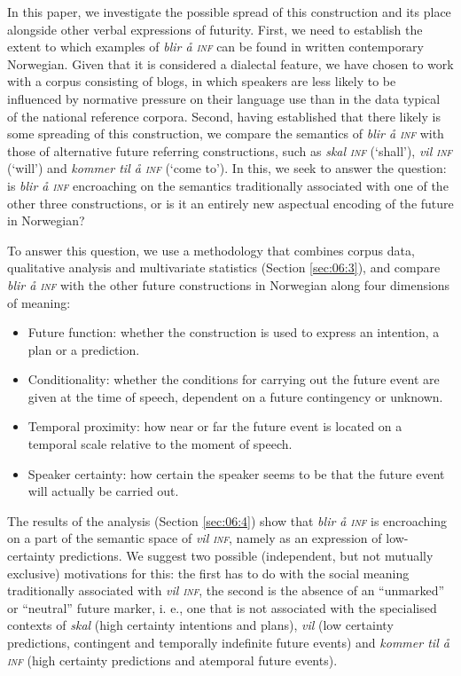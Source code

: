 \documentclass[output=paper,colorlinks,citecolor=brown]{langscibook}
\begin{document}
In this paper, we investigate the possible spread of this construction and its place alongside other verbal expressions of futurity. First, we need to establish the extent to which examples of \textit{blir å \textsc{inf}} can be found in written contemporary Norwegian. Given that it is considered a dialectal feature, we have chosen to work with a corpus consisting of blogs, in which speakers are less likely to be influenced by normative pressure on their language use than in the data typical of the national reference corpora. Second, having established that there likely is some spreading of this construction, we compare the semantics of \textit{blir å \textsc{inf}} with those of alternative future referring constructions, such as \textit{skal \textsc{inf}} (‘shall’), \textit{vil \textsc{inf}} (‘will’) and \textit{kommer til å \textsc{inf}} (‘come to’). In this, we seek to answer the question: is \textit{blir å \textsc{inf}} encroaching on the semantics traditionally associated with one of the other three constructions, or is it an entirely new aspectual encoding of the future in Norwegian? 

To answer this question, we use a methodology that combines corpus data, qualitative analysis and multivariate statistics (Section \ref{sec:06:3}), and compare \textit{blir å \textsc{inf}} with the other future constructions in Norwegian along four dimensions of meaning:
\begin{itemize}
    \item Future function: whether the construction is used to express an intention, a plan or a prediction.
    \item Conditionality: whether the conditions for carrying out the future event are given at the time of speech, dependent on a future contingency or unknown.
    \item Temporal proximity: how near or far the future event is located on a temporal scale relative to the moment of speech.
    \item Speaker certainty: how certain the speaker seems to be that the future event will actually be carried out.
\end{itemize}
The results of the analysis (Section \ref{sec:06:4}) show that \textit{blir å \textsc{inf}} is encroaching on a part of the semantic space of \textit{vil \textsc{inf}}, namely as an expression of low-certainty predictions. We suggest two possible (independent, but not mutually exclusive) motivations for this: the first has to do with the social meaning traditionally associated with \textit{vil \textsc{inf}}, the second is the absence of an “unmarked” or “neutral” future marker, i. e., one that is not associated with the specialised contexts of \textit{skal} (high certainty intentions and plans), \textit{vil} (low certainty predictions, contingent and temporally indefinite future events) and \textit{kommer til å \textsc{inf}} (high certainty predictions and atemporal future events).
\end{document}
